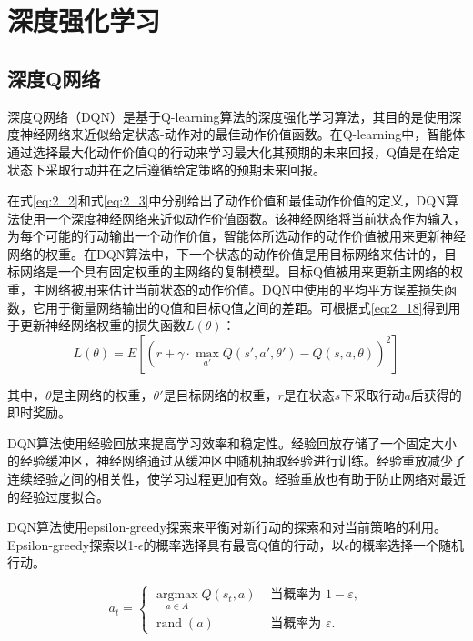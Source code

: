\section{深度强化学习}

\subsection{深度Q网络}

深度Q网络（DQN）是基于Q-learning算法的深度强化学习算法，其目的是使用深度神经网络来近似给定状态-动作对的最佳动作价值函数。在Q-learning中，智能体通过选择最大化动作价值Q的行动来学习最大化其预期的未来回报，Q值是在给定状态下采取行动并在之后遵循给定策略的预期未来回报。

在式\ref{eq:2_2}和式\ref{eq:2_3}中分别给出了动作价值和最佳动作价值的定义，DQN算法使用一个深度神经网络来近似动作价值函数。该神经网络将当前状态作为输入，为每个可能的行动输出一个动作价值，智能体所选动作的动作价值被用来更新神经网络的权重。在DQN算法中，下一个状态的动作价值是用目标网络来估计的，目标网络是一个具有固定权重的主网络的复制模型。目标Q值被用来更新主网络的权重，主网络被用来估计当前状态的动作价值。DQN中使用的平均平方误差损失函数，它用于衡量网络输出的Q值和目标Q值之间的差距。可根据式\ref{eq:2_18}得到用于更新神经网络权重的损失函数$L(\theta)$：
\begin{equation}
\label{eq:2_22}
L(\theta) = E\left[\left(r + \gamma \cdot \max _{a'} Q(s', a', \theta') - Q(s, a, \theta)\right)^2\right ]
\end{equation}


其中，$\theta$是主网络的权重，$\theta '$是目标网络的权重，$r$是在状态$s$下采取行动$a$后获得的即时奖励。

DQN算法使用经验回放来提高学习效率和稳定性。经验回放存储了一个固定大小的经验缓冲区，神经网络通过从缓冲区中随机抽取经验进行训练。经验重放减少了连续经验之间的相关性，使学习过程更加有效。经验重放也有助于防止网络对最近的经验过度拟合。

DQN算法使用epsilon-greedy探索来平衡对新行动的探索和对当前策略的利用。Epsilon-greedy探索以1-$\epsilon$的概率选择具有最高Q值的行动，以$\epsilon$的概率选择一个随机行动。

\begin{equation}
\label{eq:2_23}
{a}_{t}= \begin{cases}\underset{{a} \in A}{\operatorname{argmax}} Q\left({s}_{t} ,{a}\right) & \text { 当概率为 } 1-\varepsilon, \\ \operatorname{rand}({a}) & \text { 当概率为 } \varepsilon.\end{cases}
\end{equation}


